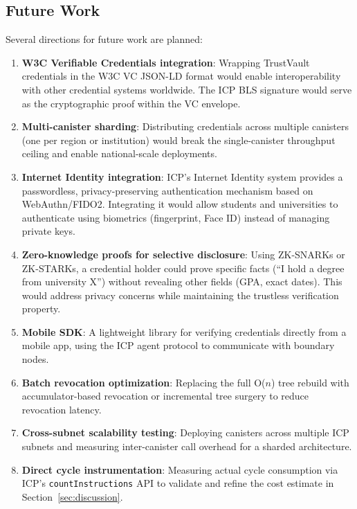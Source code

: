 \documentclass[journal]{IEEEtran}
\begin{document}
\subsection{Future Work}

Several directions for future work are planned:

\begin{enumerate}
  \item \textbf{W3C Verifiable Credentials integration}: Wrapping TrustVault credentials in the W3C VC JSON-LD format would enable interoperability with other credential systems worldwide. The ICP BLS signature would serve as the cryptographic proof within the VC envelope.
  \item \textbf{Multi-canister sharding}: Distributing credentials across multiple canisters (one per region or institution) would break the single-canister throughput ceiling and enable national-scale deployments.
  \item \textbf{Internet Identity integration}: ICP's Internet Identity system provides a passwordless, privacy-preserving authentication mechanism based on WebAuthn/FIDO2. Integrating it would allow students and universities to authenticate using biometrics (fingerprint, Face ID) instead of managing private keys.
  \item \textbf{Zero-knowledge proofs for selective disclosure}: Using ZK-SNARKs or ZK-STARKs, a credential holder could prove specific facts (``I hold a degree from university X'') without revealing other fields (GPA, exact dates). This would address privacy concerns while maintaining the trustless verification property.
  \item \textbf{Mobile SDK}: A lightweight library for verifying credentials directly from a mobile app, using the ICP agent protocol to communicate with boundary nodes.
  \item \textbf{Batch revocation optimization}: Replacing the full O($n$) tree rebuild with accumulator-based revocation or incremental tree surgery to reduce revocation latency.
  \item \textbf{Cross-subnet scalability testing}: Deploying canisters across multiple ICP subnets and measuring inter-canister call overhead for a sharded architecture.
  \item \textbf{Direct cycle instrumentation}: Measuring actual cycle consumption via ICP's \texttt{countInstructions} API to validate and refine the cost estimate in Section~\ref{sec:discussion}.
\end{enumerate}
\end{document}
